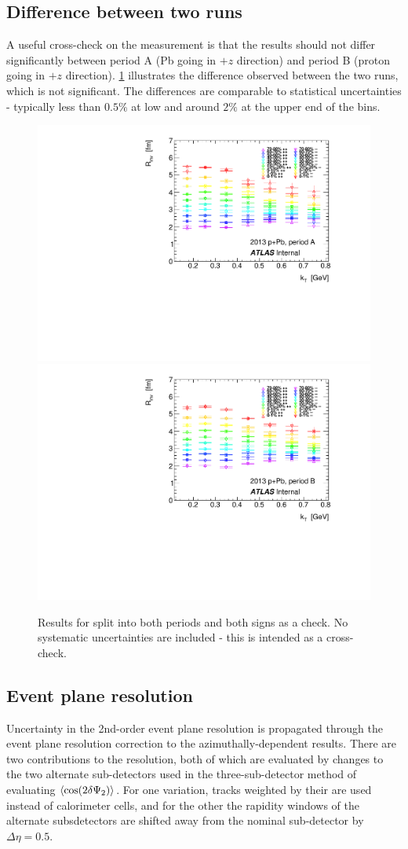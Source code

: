\subsection{Difference between two runs}

A useful cross-check on the measurement is that the results should not differ significantly between period A (Pb going in $+z$ direction) and period B (proton going in $+z$ direction).
\cref{fig:fit_inv_R_split} illustrates the difference observed between the two runs, which is not significant.
The differences are comparable to statistical uncertainties - typically less than $0.5\%$ at low \kt and around $2\%$ at the upper end of the \kt bins.

\begin{figure}[t]
\includegraphics[width=.49\linewidth]{qinv_R_vs_kt_periodA.pdf}
\includegraphics[width=.49\linewidth]{qinv_R_vs_kt_periodB.pdf}
\caption{Results for \Rinv split into both periods and both signs as a check.
No systematic uncertainties are included - this is intended as a cross-check.}
\label{fig:fit_inv_R_split}
\end{figure}

\FloatBarrier %

\subsection{Event plane resolution}
Uncertainty in the 2nd-order event plane resolution is propagated through the event plane resolution correction to the azimuthally-dependent results. There are two contributions to the \psit resolution, both of which are evaluated by changes to the two alternate sub-detectors used in the three-sub-detector method of evaluating $\langle \cos(2\delta\Psi_{2}) \rangle$. For one variation, tracks weighted by their \pt are used instead of calorimeter cells, and for the other the rapidity windows of the alternate subsdetectors are shifted away from the nominal sub-detector by $\Delta\eta = 0.5$.

